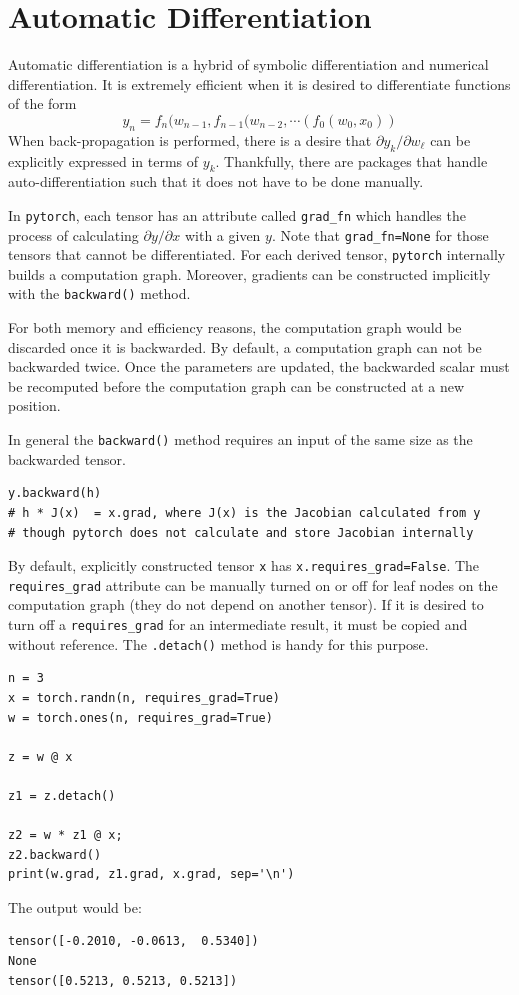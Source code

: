 \chapter{Automatic Differentiation}
Automatic differentiation is a hybrid of symbolic differentiation and numerical differentiation.
It is extremely efficient when it is desired to differentiate functions of the form
$$y_n=f_n(w_{n-1}, f_{n-1}(w_{n-2},\cdots (f_0(w_0, x_0)) $$
When back-propagation is performed, there is a desire that $\partial y_{k}/\partial w_{\ell}$ can be explicitly expressed in terms of $y_k$.
Thankfully, there are packages that handle auto-differentiation such that it does not have to be done manually.

In \texttt{pytorch}, each tensor has an attribute called \texttt{grad\_fn} which handles the process of calculating $\partial y/\partial x$ with a given $y$.
Note that \texttt{grad\_fn=None} for those tensors that cannot be differentiated.
For each derived tensor, \texttt{pytorch} internally builds a computation graph.
Moreover, gradients can be constructed implicitly with the \texttt{backward()} method.

For both memory and efficiency reasons, the computation graph would be discarded once it is backwarded.
By default, a computation graph can not be backwarded twice.
Once the parameters are updated, the backwarded scalar must be recomputed before the computation graph can be constructed at a new position.

In general the \texttt{backward()} method requires an input of the same size as the backwarded tensor.
\begin{verbatim}
y.backward(h)
# h * J(x)  = x.grad, where J(x) is the Jacobian calculated from y
# though pytorch does not calculate and store Jacobian internally
\end{verbatim}

By default, explicitly constructed tensor \texttt{x}
has \texttt{x.requires\_grad=False}.
The \texttt{requires\_grad} attribute can be manually turned on or off for leaf nodes on the computation graph (they do not depend on another tensor).
If it is desired to turn off a \texttt{requires\_grad} for an intermediate result, it must be copied and without reference.
The \texttt{.detach()} method is handy for this purpose.
\begin{verbatim}
n = 3
x = torch.randn(n, requires_grad=True)
w = torch.ones(n, requires_grad=True)

z = w @ x

z1 = z.detach()

z2 = w * z1 @ x;
z2.backward()
print(w.grad, z1.grad, x.grad, sep='\n')
\end{verbatim}
The output would be:
\begin{verbatim}
tensor([-0.2010, -0.0613,  0.5340])
None
tensor([0.5213, 0.5213, 0.5213])
\end{verbatim}


